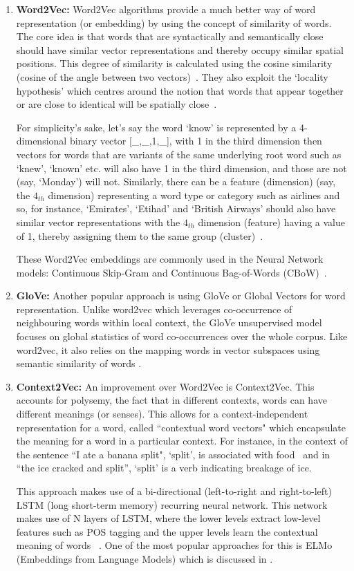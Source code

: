 \begin{enumerate}
    \item \textbf{Word2Vec:} Word2Vec algorithms provide a much better way of word representation (or embedding) by using the concept of similarity of words. The core idea is that words that are syntactically and semantically close should have similar vector representations and thereby occupy similar spatial positions. This degree of similarity is calculated using the cosine similarity (cosine of the angle between two vectors)~\cite{efficient_word_rep}. They also exploit the `locality hypothesis' which centres around the notion that words that appear together or are close to identical  will be spatially close~\cite{elmo_word_rep}.

For simplicity's sake, let's say the word `know' is represented by a 4-dimensional binary vector [\_,\_,1,\_], with 1 in the third dimension then vectors for words that are variants of the same underlying root word such as `knew', `known' etc. will also have 1 in the third dimension, and those are not (say, `Monday') will not. Similarly, there can be a feature (dimension) (say, the $4_{th}$ dimension) representing a word type or category such as airlines and so, for instance, `Emirates', `Etihad' and `British Airways' should also have similar vector representations with the $4_{th}$ dimension (feature) having a value of 1, thereby assigning them to the same group (cluster)~\cite{32_contextual_word}.

These Word2Vec embeddings are commonly used in the Neural Network models: Continuous Skip-Gram and Continuous Bag-of-Words (CBoW)~\cite{efficient_word_rep}.

\item \textbf{GloVe:} Another popular approach is using GloVe or Global Vectors for word representation. Unlike word2vec which leverages co-occurrence of neighbouring words within local context, the GloVe unsupervised model focuses on global statistics of word co-occurrences over the whole corpus. Like word2vec, it also relies on the mapping words in vector subspaces using semantic similarity of words \cite{glove}. 

\item \textbf{Context2Vec:} An improvement over Word2Vec is Context2Vec. This accounts for polysemy, the fact that in different contexts, words can have different meanings (or senses). This allows for a context-independent representation for a word, called
``contextual word vectors" which encapsulate the meaning for a word in a particular context. For instance, in the context of the sentence ``I ate a banana split", `split', is associated with food~\cite{32_contextual_word} and in ``the ice cracked and split'', `split' is a verb indicating breakage of ice.

This approach makes use of a bi-directional (left-to-right and right-to-left) LSTM (long short-term memory) recurring neural network. This network makes use of N layers of LSTM, where the lower levels extract low-level features such as POS tagging and the upper levels learn the contextual meaning of words ~\cite{elmo_word_rep}. One of the most popular approaches for this is ELMo (Embeddings from Language Models) which is discussed in .
\end{enumerate}

